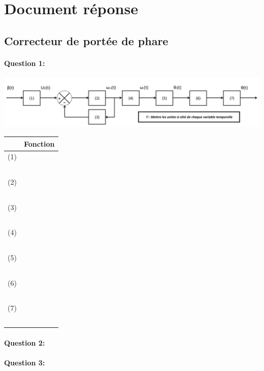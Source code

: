 \pagestyle{documentreponse}

\section{Document réponse}

\subsection{Correcteur de portée de phare}

\paragraph{Question 1:}

\begin{center}
  \includegraphics[width=0.8\linewidth]{img/rep1}

\begin{tabular}{|c|m{10cm}|}
\hline
 & Fonction \\
\hline
 (1) & \\
  ~\ & \\
\hline
 (2) & \\
  ~\ & \\
\hline
 (3) & \\
  ~\ & \\
\hline
 (4) & \\
  ~\ & \\
\hline
 (5) & \\
  ~\ & \\
\hline
 (6) & \\
  ~\ & \\
\hline
 (7) & \\
  ~\ & \\
\hline
\end{tabular}
\end{center}

\paragraph{Question 2:}

\reponse[4]


\paragraph{Question 3:}

